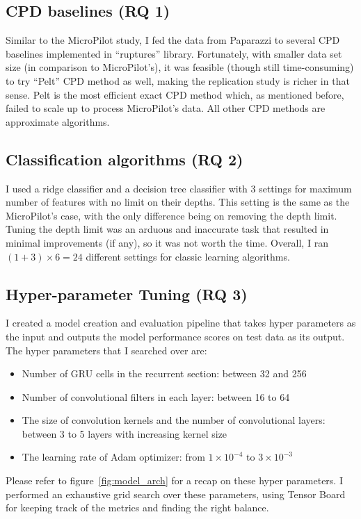 \subsection{CPD baselines (RQ 1)}
Similar to the MicroPilot study, I fed the data from Paparazzi to several CPD baselines implemented in ``ruptures'' library.
Fortunately, with smaller data set size (in comparison to MicroPilot's), it was feasible (though still time-consuming) to try ``Pelt'' CPD method \cite{killick2012optimal} as well, making the replication study is richer in that sense. Pelt is the most efficient exact CPD method which, as mentioned before, failed to scale up to process MicroPilot's data. All other CPD methods are approximate algorithms.

\subsection{Classification algorithms (RQ 2)}
I used a ridge classifier and a decision tree classifier with 3 settings for maximum number of features with no limit on their depths. This setting is the same as the MicroPilot's case, with the only difference being on removing the depth limit. Tuning the depth limit was an arduous and inaccurate task that resulted in minimal improvements (if any), so it was not worth the time. Overall, I ran $(1+3)\times6=24$ different settings for classic learning algorithms. 

\subsection{Hyper-parameter Tuning (RQ 3)}
I created a model creation and evaluation pipeline that takes hyper parameters as the input and outputs the model performance scores on test data as its output. The hyper parameters that I searched over are:
\begin{itemize}
    \item Number of GRU cells in the recurrent section: between 32 and 256
    \item Number of convolutional filters in each layer: between 16 to 64
    \item The size of convolution kernels and the number of convolutional layers: between 3 to 5 layers with increasing kernel size
    \item The learning rate of Adam optimizer: from $1\times 10^{-4}$ to $3\times10^{-3}$
\end{itemize}
Please refer to figure~\ref{fig:model_arch} for a recap on these hyper parameters. 
I performed an exhaustive grid search over these parameters, using Tensor Board for keeping track of the metrics and finding the right balance.


